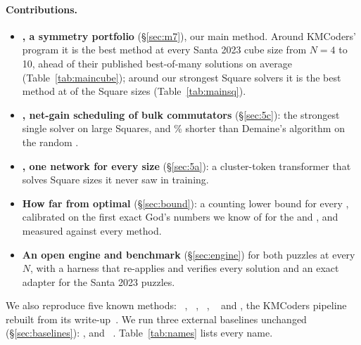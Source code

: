 \paragraph{Contributions.}
\begin{itemize}
\item \textbf{\Mseven, a symmetry portfolio} (\S\ref{sec:m7}), our main method. Around KMCoders' program it is the best
  method at every Santa 2023 cube size from $N=4$ to 10, ahead of their published best-of-many solutions on average
  (Table~\ref{tab:maincube}); around our strongest Square solvers it is the best method at \MsevenRedSquare{} of the
  \SizesSquare{} Square sizes (Table~\ref{tab:mainsq}).
\item \textbf{\FiveC, net-gain scheduling of bulk commutators} (\S\ref{sec:5c}): the strongest single solver on large
  Squares, and \FiveCGainTwenty\% shorter than Demaine's algorithm on the random .
\item \textbf{\FiveA, one network for every size} (\S\ref{sec:5a}): a cluster-token transformer that solves Square
  sizes it never saw in training.
\item \textbf{How far from optimal} (\S\ref{sec:bound}): a counting lower bound for every , calibrated on the
  first exact God's numbers we know of for the  and , and measured against every method.
\item \textbf{An open engine and benchmark} (\S\ref{sec:engine}) for both puzzles at every $N$, with a harness that
  re-applies and verifies every solution and an exact adapter for the Santa 2023 puzzles.
\end{itemize}
We also reproduce five known methods: \Mone~\cite{korf1997optimal}, \Mtwo~\cite{kociemba2phase},
\Mthree~\cite{demaine2011algorithms}, \Mfour~\cite{chervov2025cayleypy} and \Msix, the KMCoders pipeline rebuilt from its
write-up~\cite{kmcoders2024santa}. We run three external baselines unchanged (\S\ref{sec:baselines}): \Bone, \Btwo and
\Bthree~\cite{walton2017nxnxn}. Table~\ref{tab:names} lists every name.
